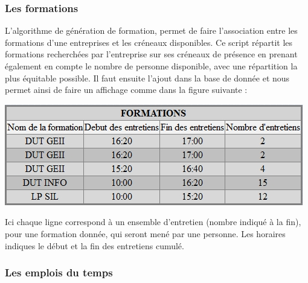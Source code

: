 \documentclass[12pt,a4paper]{article}
\begin{document}
\subsubsection*{Les formations}

\begin{large}
\begin{onehalfspace}L’algorithme de génération de formation, permet de faire l’association entre les formations d’une entreprises et les créneaux disponibles. Ce script répartit les formations recherchées par l’entreprise sur ses créneaux de présence en prenant également en compte le nombre de personne disponible, avec une répartition la plus équitable possible. Il faut ensuite l’ajout dans la base de donnée et nous permet ainsi de faire un affichage comme dans la figure suivante :

  \includegraphics[scale=0.68]{figure9(3_5).jpg}

	Ici chaque ligne correspond à un ensemble d’entretien (nombre indiqué à la fin), pour une formation donnée, qui seront mené par une personne. Les horaires indiques le début et la fin des entretiens cumulé.
\end{onehalfspace}
\end{large}

\subsubsection*{Les emplois du temps}
\end{document}
